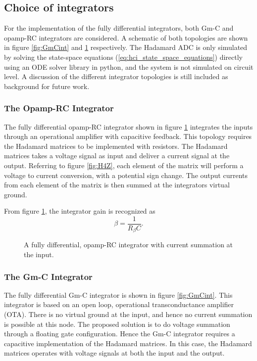 \subsection{Choice of integrators}
For the implementation of the fully differential integrators, both Gm-C and opamp-RC integrators are considered. A schematic of both topologies are shown in figure \ref{fig:GmCint} and \ref{fig:OpampRCint_fd} respectively. The Hadamard ADC is only simulated by solving the state-space equations (\ref{eq:hci_state_space_equations}) directly using an ODE solver library in python, and the system is not simulated on circuit level. A discussion of the different integrator topologies is still included as background for future work.

\subsubsection*{The Opamp-RC Integrator}
The fully differential opamp-RC integrator shown in figure \ref{fig:OpampRCint_fd} integrates the inputs through an operational amplifier with capacitive feedback. This topology requires the Hadamard matrices to be implemented with resistors. The Hadamard matrices takes a voltage signal as input and deliver a current signal at the output. Referring to figure \ref{fig:H4Z}, each element of the matrix will perform a voltage to current conversion, with a potential sign change. The output currents from each element of the matrix is then summed at the integrators virtual ground.

From figure \ref{fig:OpampRCint_fd}, the integrator gain is recognized as
\begin{equation}
    \beta = \frac{1}{R_\beta C}.
\end{equation}

\begin{figure}[htbp]
    \centering
    
    \caption{A fully differential, opamp-RC integrator with current summation at the input.}
    \label{fig:OpampRCint_fd}
\end{figure}

\subsubsection*{The Gm-C Integrator}
The fully differential Gm-C integrator is shown in figure \ref{fig:GmCint}. This integrator is based on an open loop, operational transconductance amplifier (OTA). There is no virtual ground at the input, and hence no current summation is possible at this node. The proposed solution is to do voltage summation through a floating gate configuration. Hence the Gm-C integrator requires a capacitive implementation of the Hadamard matrices. In this case, the Hadamard matrices operates with voltage signals at both the input and the output.


